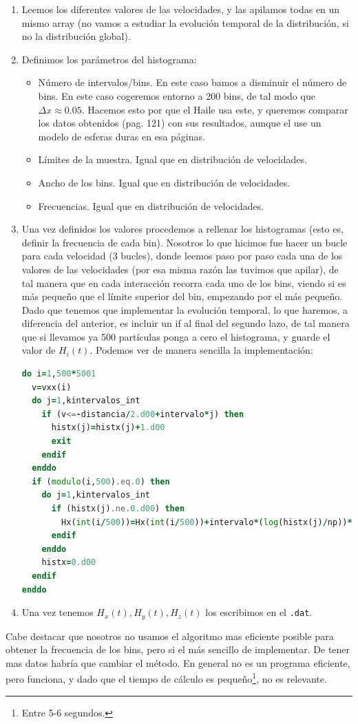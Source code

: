 \documentclass[11pt]{article} %
\begin{document}
\begin{enumerate}
	\item Leemos los diferentes valores de las velocidades, y las apilamos todas en un mismo array (no vamos a estudiar la evolución temporal de la distribución, si no la distribución global). 
	\item Definimos los parámetros del histograma:
	\begin{itemize}
		\item Número de intervalos/bins. En este caso bamos a disminuir el número de bins. En este caso cogeremos entorno a 200 bins, de tal modo que $\Delta x\approx 0.05$. Hacemos esto por que el Haile \cite{Haile} usa este, y queremos comparar los datos obtenidos (pag. 121) con sus resultados, aunque el use un modelo de esferas duras en esa páginas.
		\item Límites de la muestra. Igual que en distribución de velocidades.
		\item Ancho de los bins. Igual que en distribución de velocidades.
		\item Frecuencias. Igual que en distribución de velocidades.
	\end{itemize}
	\item Una vez definidos los valores procedemos a rellenar los histogramas (esto es, definir la frecuencia de cada bin). Nosotros lo que hicimos fue hacer un bucle para cada velocidad (3 bucles), donde leemos paso por paso cada una de los valores de las velocidades (por esa misma razón las tuvimos que apilar), de tal manera que en cada interacción recorra cada uno de los bins, viendo si es más pequeño que el límite superior del bin, empezando por el más pequeño. Dado que tenemos que implementar la evolución temporal, lo que haremos, a diferencia del anterior, es incluir un if al final del segundo lazo, de tal manera que si llevamos ya 500 partículas ponga a cero el histograma, y guarde el valor de $H_i(t)$. Podemos ver de manera sencilla la implementación:

\begin{lstlisting}[language=Fortran]
do i=1,500*5001
  v=vxx(i)   
  do j=1,kintervalos_int
    if (v<=-distancia/2.d00+intervalo*j) then
      histx(j)=histx(j)+1.d00
      exit
    endif   
  enddo     
  if (modulo(i,500).eq.0) then 
    do j=1,kintervalos_int
      if (histx(j).ne.0.d00) then
        Hx(int(i/500))=Hx(int(i/500))+intervalo*(log(histx(j)/np))*histx(j)/np
      endif    
    enddo     
    histx=0.d00
  endif  
enddo
\end{lstlisting}
	\item Una vez tenemos $H_x(t),H_y(t),H_z(t)$ los escribimos en el \texttt{.dat}.
	
\end{enumerate}
Cabe destacar que nosotros no usamos el algoritmo mas eficiente posible para obtener la frecuencia de los bins, pero si el más sencillo de implementar. De tener mas datos habría que cambiar el método. En general no es un programa eficiente, pero funciona, y dado que el tiempo de cálculo es pequeño\footnote{Entre 5-6 segundos.}, no es relevante. 
\end{document}
